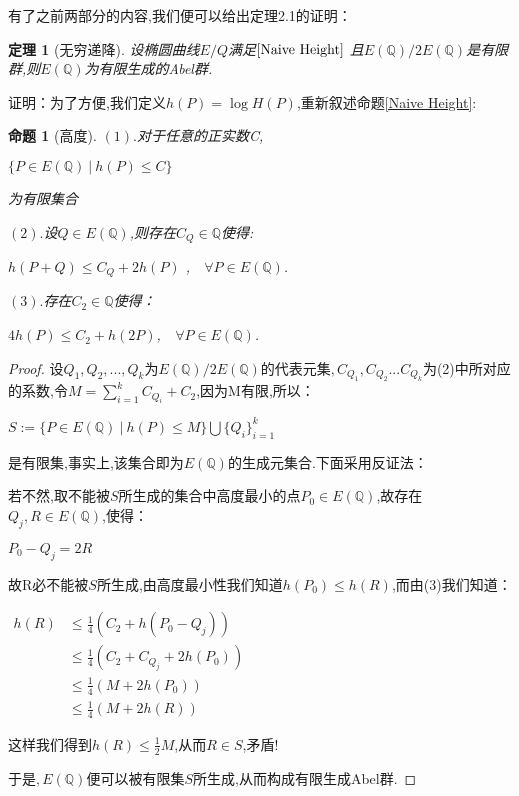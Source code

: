 \documentclass[11pt]{ctexart}
\DeclareMathOperator{\Log}{log}
\newtheorem{thm}{定理}[section]
\newtheorem{pro}{命题}[section]
\begin{document}
有了之前两部分的内容,我们便可以给出定理2.1的证明：

\begin{thm}[无穷递降]\label{Descent}
    设椭圆曲线$E/Q$满足$ \ref{Naive Height} $ 且$E(\mathbb{Q})/2E(\mathbb{Q})$是有限群,则$E(\mathbb{Q})$为有限生成的Abel群.
\end{thm}
\noindent
证明：为了方便,我们定义$h(P)=\Log H(P)$,重新叙述命题\ref{Naive Height}:
\begin{pro}[高度]\label{Height}$(1).$对于任意的正实数C,
\begin{center}
        $\{P\in E(\mathbb{Q})~|~h(P)\leqslant C\}$
\end{center}

为有限集合
    
$(2).$设$Q \in E(\mathbb{Q})$,则存在$C_Q\in \mathbb{Q}$使得:

\begin{center}
    $h(P+Q)\leqslant C_Q+2h(P)$ ,~~$\forall P \in E(\mathbb{Q})$.
\end{center}

$(3).$存在$C_2\in \mathbb{Q}$使得：
\begin{center}
    $4h(P) \leqslant C_2+h(2P)$,~~$\forall P \in E(\mathbb{Q})$.
\end{center}
\end{pro}
\begin{proof}
设$Q_1,Q_2,...,Q_k$为$E(\mathbb{Q})/2E(\mathbb{Q})$的代表元集$,C_{Q_1},C_{Q_2}...C_{Q_k}$为(2)中所对应的系数,令$M=\sum_{i=1}^{k}C_{Q_i} +C_2 $,因为M有限,所以：

\begin{center}
    $S:= \{P\in E(\mathbb{Q})~|~h(P)\leqslant M\} \bigcup \{Q_i\}_{i=1}^{k}$
\end{center}
\noindent
是有限集,事实上,该集合即为$E(\mathbb{Q})$的生成元集合.下面采用反证法：

若不然,取不能被$S$所生成的集合中高度最小的点$P_0\in E(\mathbb{Q})$,故存在$Q_j,R\in E(\mathbb{Q})$,使得：
\begin{center}
   $ P_0-Q_j=2R$
\end{center}
故R必不能被$S$所生成,由高度最小性我们知道$h(P_0)\leqslant h(R)$,而由(3)我们知道：
\begin{center}
$\begin{array}{cl}
    h(R)&\leqslant\frac{1}{4}(C_2+h(P_0-Q_j))\\

   &\leqslant\frac{1}{4}(C_2+C_{Q_j}+2h(P_0))\\

    &\leqslant\frac{1}{4}(M+2h(P_0))\\

    &\leqslant\frac{1}{4}(M+2h(R))
\end{array}$
\end{center}
\noindent
这样我们得到$h(R)\leqslant\frac{1}{2}M$,从而$R\in S$,矛盾!
  
于是$,E(\mathbb{Q})$便可以被有限集$S$所生成,从而构成有限生成Abel群.
\end{proof}
\end{document}
